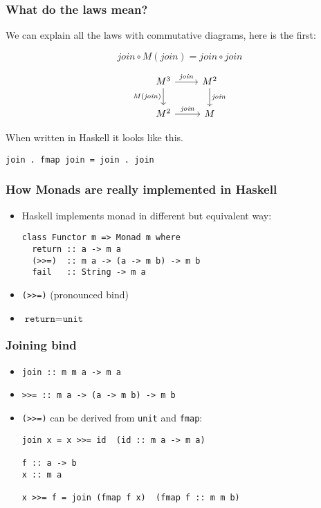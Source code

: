 \documentclass{beamer} %
\begin{document}
\begin{frame}[fragile]\frametitle{What do the laws mean?}
We can explain all the laws
with commutative diagrams, here is the first:

\[\mathit{join} \circ M(\mathit{join}) = \mathit{join} \circ \mathit{join}\]

\[
\begin{tikzcd}
M^3 \arrow{r}{\mathit{join}} \arrow[swap]{d}{M(\mathit{join})} & M^2 \arrow{d}{\mathit{join}} \\
M^2 \arrow{r}{\mathit{join}} & M
\end{tikzcd}
\]

When written in Haskell it looks like this.

\begin{verbatim}
join . fmap join = join . join
\end{verbatim}
\end{frame}

\begin{frame}[fragile]\frametitle{How Monads are really implemented in Haskell}
\begin{itemize}
  \item Haskell implements monad in different but equivalent way:

\begin{verbatim}
class Functor m => Monad m where
  return :: a -> m a
  (>>=)  :: m a -> (a -> m b) -> m b
  fail   :: String -> m a
\end{verbatim}
\item \texttt{(>>=)} (pronounced bind)
\item $\texttt{return} = \texttt{unit}$
\end{itemize}

\end{frame}

\begin{frame}[fragile]\frametitle{Joining bind}
\begin{itemize}

  \item  \texttt{join :: m m a -> m a}

  \item  \texttt{>>=  :: m a -> (a -> m b) -> m b}

\item \texttt{(>>=)} can be derived from \texttt{unit} and \texttt{fmap}:

\begin{verbatim}
join x = x >>= id  (id :: m a -> m a)

f :: a -> b
x :: m a

x >>= f = join (fmap f x)  (fmap f :: m m b)
\end{verbatim}
\end{itemize}
\end{frame}
\end{document}
